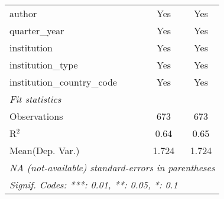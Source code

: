 \begin{tabular}{lcc}
   author                                   & Yes   & Yes\\  
   quarter\_year                            & Yes   & Yes\\  
   institution                              & Yes   & Yes\\  
   institution\_type                        & Yes   & Yes\\  
   institution\_country\_code               & Yes   & Yes\\  
   \midrule
   \emph{Fit statistics}\\
   Observations                             & 673   & 673\\  
   R$^2$                                    & 0.64  & 0.65\\  
Mean(Dep. Var.) & 1.724 & 1.724 \\
   \midrule \midrule
   \multicolumn{3}{l}{\emph{NA (not-available) standard-errors in parentheses}}\\
   \multicolumn{3}{l}{\emph{Signif. Codes: ***: 0.01, **: 0.05, *: 0.1}}\\
\end{tabular}
\par\endgroup
